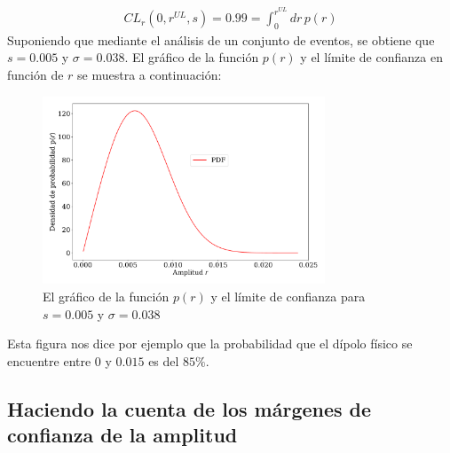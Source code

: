 \begin{align}
    CL_r(0,r^{UL},s) = 0.99 = \int_{0}^{r^{UL}} dr \, p(r)
    \label{ec:r_upper_limit}
\end{align} 
Suponiendo que mediante el análisis de un conjunto de eventos, se obtiene que $s=0.005$ y $\sigma=0.038$. El gráfico de la función $p(r)$ y el límite de confianza en función de $r$ se muestra a continuación:

\begin{figure}[H]
    \begin{small}
        \begin{center}
            \includegraphics[width=0.75\textwidth]{bessel_prob_v2.pdf}
        \end{center}
        \caption{El gráfico de la función $p(r)$ y el límite de confianza para $s=0.005$ y $\sigma=0.038$ }
    \end{small}
\end{figure}

Esta figura nos dice por ejemplo que la probabilidad que el dípolo físico se encuentre entre $0$ y $0.015$ es del $85\%$.

\subsection{Haciendo la cuenta de los márgenes de confianza de la amplitud}

